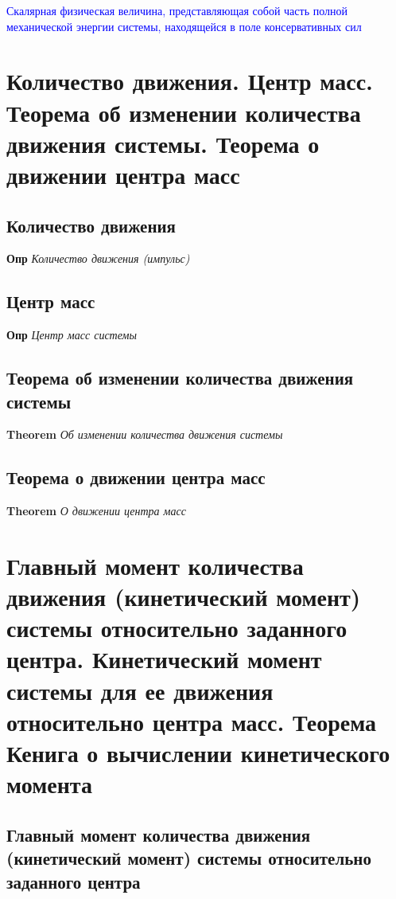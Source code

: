 \documentclass[a4paper, 14pt]{article}
\begin{document}
    \textcolor{blue}{Скалярная физическая величина, представляющая собой часть полной механической
    энергии системы, находящейся в поле консервативных сил}
    
    \section{Количество движения.
    Центр масс.
    Теорема об изменении количества движения системы.
    Теорема о движении центра масс}
    
    \subsection{Количество движения}
    
    \textbf{Опр} \textit{Количество движения (импульс)}
    
    \subsection{Центр масс}
    
    \textbf{Опр} \textit{Центр масс системы}
    
    \subsection{Теорема об изменении количества движения системы}
    
    \textbf{Theorem} \textit{Об изменении количества движения системы}
    
    \subsection{Теорема о движении центра масс}
    
    \textbf{Theorem} \textit{О движении центра масс}
    
    \section{Главный момент количества движения (кинетический момент) системы относительно заданного центра.
    Кинетический момент системы для ее движения относительно центра масс.
    Теорема Кенига о вычислении кинетического момента}
    
    \subsection{Главный момент количества движения (кинетический момент) системы относительно заданного центра}
    
\end{document}
